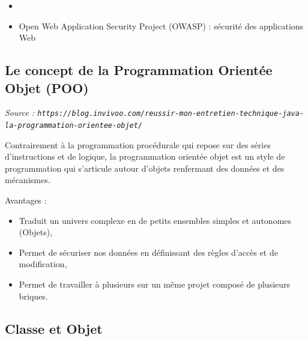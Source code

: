 \documentclass[11pt,twoside,a4paper]{article}
\begin{document}
\begin{landscape}
\begin{multicols}{2}
\begin{itemize}
\begin{itemize}
				\item 6 : correctifs...
				\item 7 : notation binaire, formatage num{\'e}rique, switch string, inf{\'e}rence types g{\'e}n{\'e}riques {\`a} la cr{\'e}ation, multicatch exceptions, java.nio (Files, Path...), autoboxing des primitifs...
				\item 8 : lambda, stream, interfaces fonctionnelles
				\item 9 : jigsaw (modularisation) ; kulla (JShell) ; JSON natif et http2
				\item 10 : inf{\'e}rence types "var", Graal / JIT plus rapide
				\item 11 : am{\'e}liorations lambda, surpression CORBA
		\end{itemize}
		\item[]
		\item Open Web Application Security Project (OWASP) : s{\'e}curit{\'e} des applications Web
	\end{itemize} %
	
	\vfill
	
	\columnbreak
	

\subsection*{Le concept de la Programmation Orient{\'e}e Objet (POO)}
\emph{\footnotesize Source : \texttt{https://blog.invivoo.com/reussir-mon-entretien-technique-java-la-programmation-orientee-objet/} }

Contrairement {\`a} la programmation proc{\'e}durale qui repose sur des s{\'e}ries d'instructions et de logique, la programmation orient{\'e}e objet est un style de programmation qui s'articule autour d'objets renfermant des donn{\'e}es et des m{\'e}canismes.

Avantages :
\begin{itemize}
	\item Traduit un univers complexe en de petits ensembles simples et autonomes (Objets),
    \item Permet de s{\'e}curiser nos donn{\'e}es en d{\'e}finissant des r{\`e}gles d'acc{\`e}s et de modification,
    \item Permet de travailler {\`a} plusieurs sur un m{\^e}me projet compos{\'e} de plusieurs briques.
\end{itemize}

\subsection*{Classe et Objet}

\end{multicols}
\end{landscape}
\end{document}

